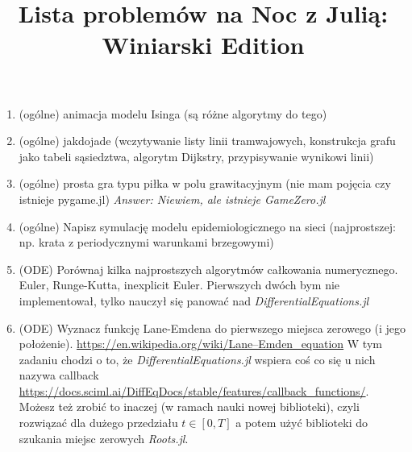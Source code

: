 \documentclass[12pt]{article}
\title{Lista problemów na Noc z Julią: Winiarski Edition}
\author{}
\date{} %
\begin{document}
\maketitle %

\begin{enumerate}
\item (ogólne)
animacja modelu Isinga (są różne algorytmy do tego)
\item (ogólne)
jakdojade (wczytywanie listy linii tramwajowych, konstrukcja grafu jako tabeli sąsiedztwa, algorytm Dijkstry, przypisywanie wynikowi linii)
\item (ogólne)
prosta gra typu piłka w polu grawitacyjnym (nie mam pojęcia czy istnieje pygame.jl) \emph{Answer: Niewiem, ale istnieje GameZero.jl}
\item (ogólne)
Napisz symulację modelu epidemiologicznego na sieci (najprostszej: np. krata z periodycznymi warunkami brzegowymi)
%
%
\item (ODE)
Porównaj kilka najprostszych algorytmów całkowania numerycznego. Euler, Runge-Kutta, inexplicit Euler.
Pierwszych dwóch bym nie implementował, tylko nauczył się panować nad \emph{DifferentialEquations.jl}
\item (ODE)
Wyznacz funkcję Lane-Emdena do pierwszego miejsca zerowego (i jego położenie). \url{https://en.wikipedia.org/wiki/Lane–Emden_equation} W tym zadaniu chodzi o to, że \emph{DifferentialEquations.jl} wspiera coś co się u nich nazywa callback
\url{https://docs.sciml.ai/DiffEqDocs/stable/features/callback_functions/}.
Możesz też zrobić to inaczej (w ramach nauki nowej biblioteki), czyli rozwiązać dla dużego przedziału $t \in [0, T]$ a potem użyć biblioteki do szukania miejsc zerowych \emph{Roots.jl}.


\end{enumerate}
\end{document}
